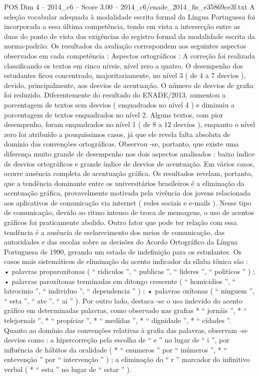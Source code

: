 \begin{textsample}{POS Dim 4 – 2014\_c6 – Score 3.00 – 2014\_c6/enade\_2014\_fis\_e35869ce3f.txt}
A seleção vocabular adequada à modalidade escrita formal da Língua Portuguesa foi incorporada a essa última competência, tendo em vista a intersecção entre as duas do ponto de vista das exigências do registro formal da modalidade escrita da norma-padrão.
Os resultados da avaliação correspondem aos seguintes aspectos observados em cada competência : Aspectos ortográficos : A correção foi realizada classificando os textos em cinco níveis, nível zero a quatro.
O desempenho dos estudantes ficou concentrado, majoritariamente, no nível 3 ( de 4 a 7 desvios ), devido, principalmente, aos desvios de acentuação.
O número de desvios de grafia foi reduzido.
Diferentemente do resultado do ENADE/2013, aumentou a porcentagem de textos sem desvios ( enquadrados no nível 4 ) e diminuiu a porcentagem de textos enquadrados no nível 2.
Alguns textos, com pior desempenho, foram enquadrados no nível 1 ( de 8 a 12 desvios ), enquanto o nível zero foi atribuído a pouquíssimos casos, já que ele revela falta absoluta de domínio das convenções ortográficas.
Observou -se, portanto, que existe uma diferença muito grande de desempenho nos dois aspectos analisados : baixo índice de desvios ortográficos e grande índice de desvios de acentuação.
Em vários casos, ocorre ausência completa de acentuação gráfica.
Os resultados revelam, portanto, que a tendência dominante entre os universitários brasileiros é a eliminação da acentuação gráfica, provavelmente motivada pela vivência dos jovens relacionada aos aplicativos de comunicação via internet ( redes sociais e e-mails ).
Nesse tipo de comunicação, devido ao ritmo intenso de troca de mensagens, o uso de acentos gráficos foi praticamente abolido.
Outro fator que pode ter relação com essa tendência é a ausência de esclarecimento dos meios de comunicação, das autoridades e das escolas sobre as decisões do Acordo Ortográfico da Língua Portuguesa de 1990, gerando um estado de indefinição para os estudantes.
Os casos mais sistemáticos de eliminação do acento indicador da sílaba tônica são : • palavras proparoxítonas ( “ ridiculos ”, “ publicas ”, “ lideres ”, “ politicos ” ) ; • palavras paroxítonas terminadas em ditongo crescente ( “ homicidios ”, “ latrocinio ”, “ individuo ”, “ dependencia ” ) ; • palavras oxítonas ( “ ninguem ”, “ esta ”, “ ate ”, “ ai ” ).
Por outro lado, destaca -se o uso indevido do acento gráfico em determinadas palavras, como observado nas grafias * “ jornáis ”, * “ telejornaís ”, * “ propíciar ”, * “ medídas ”, * “ dígnidade ”, * “ cídades ”.
Quanto ao domínio das convenções relativas à grafia das palavras, observam -se desvios como : a hipercorreção pela escolha de “ e ” no lugar de “ i ”, por influência de hábitos da oralidade ( * “ enumeros ” por “ inúmeros ”, * “ entevenção ” por “ intervenção ” ) ; a eliminação do “ r ” marcador do infinitivo verbal ( * “ esta ” no lugar de “ estar ” ).

\end{textsample}
